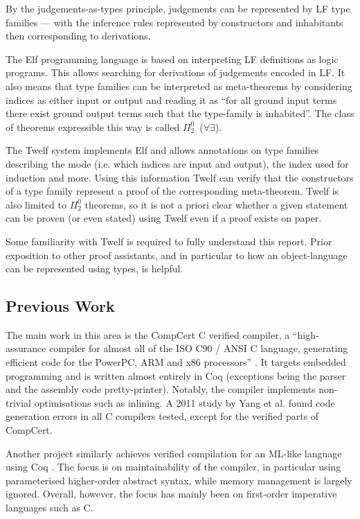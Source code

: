 By the judgements-as-types principle, judgements can be represented by LF type families --- with the inference rules represented by constructors and inhabitants then corresponding to derivations.

The Elf programming language \cite{Pfenning91} is based on interpreting LF definitions as logic programs.
This allows searching for derivations of judgements encoded in LF.
It also means that type families can be interpreted as meta-theorems by considering indices as either input or output and reading it as ``for all ground input terms there exist ground output terms such that the type-family is inhabited''.
The class of theorems expressible this way is called $\Pi_2^0$~($\forall \exists$).

The Twelf system \cite{PfenningSchurmann99} implements Elf and allows annotations on type families describing the mode (i.e. which indices are input and output), the index used for induction and more.
Using this information Twelf can verify that the constructors of a type family represent a proof of the corresponding meta-theorem.
Twelf is also limited to $\Pi_2^0$ theorems, so it is not a priori clear whether a given statement can be proven (or even stated) using Twelf even if a proof exists on paper.

Some familiarity with Twelf is required to fully understand this report.
Prior exposition to other proof assistants, and in particular to how an object-language can be represented using types, is helpful.


\subsection{Previous Work}

The main work in this area is the CompCert C verified compiler, a ``high-assurance compiler for almost all of the ISO C90 / ANSI C language, generating efficient code for the PowerPC, ARM and x86 processors'' \cite{CompCert16}.
It targets embedded programming and is written almost entirely in Coq (exceptions being the parser and the assembly code pretty-printer).
Notably, the compiler implements non-trivial optimisations such as inlining.
A 2011 study by Yang et al. \cite{Yang11} found code generation errors in all C compilers tested, except for the verified parts of CompCert.

Another project similarly achieves verified compilation for an ML-like language using Coq \cite{Chlipala10}.
The focus is on maintainability of the compiler, in particular using parameterised higher-order abstract syntax, while memory management is largely ignored.
Overall, however, the focus has mainly been on first-order imperative languages such as C.


